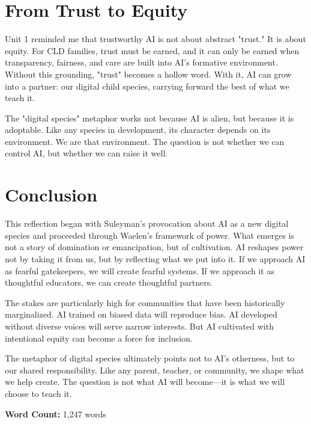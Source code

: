 \documentclass[11pt,twoside]{article}
\begin{document}
\section{From Trust to Equity}

Unit 1 reminded me that trustworthy AI is not about abstract "trust." It is about equity. For CLD families, trust must be earned, and it can only be earned when transparency, fairness, and care are built into AI's formative environment. Without this grounding, "trust" becomes a hollow word. With it, AI can grow into a partner: our digital child species, carrying forward the best of what we teach it.

The "digital species" metaphor works not because AI is alien, but because it is adoptable. Like any species in development, its character depends on its environment. We are that environment. The question is not whether we can control AI, but whether we can raise it well.

\section{Conclusion}

This reflection began with Suleyman's provocation about AI as a new digital species and proceeded through Waelen's framework of power. What emerges is not a story of domination or emancipation, but of cultivation. AI reshapes power not by taking it from us, but by reflecting what we put into it. If we approach AI as fearful gatekeepers, we will create fearful systems. If we approach it as thoughtful educators, we can create thoughtful partners.

The stakes are particularly high for communities that have been historically marginalized. AI trained on biased data will reproduce bias. AI developed without diverse voices will serve narrow interests. But AI cultivated with intentional equity can become a force for inclusion.

The metaphor of digital species ultimately points not to AI's otherness, but to our shared responsibility. Like any parent, teacher, or community, we shape what we help create. The question is not what AI will become—it is what we will choose to teach it.

\vspace{1em}
\noindent\textbf{Word Count:} 1,247 words
\end{document}
